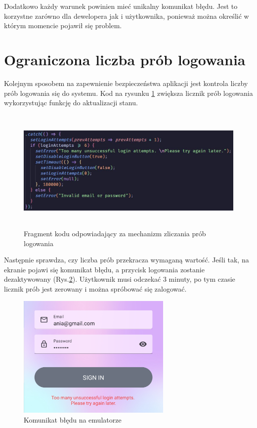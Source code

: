 Dodatkowo każdy warunek powinien mieć unikalny komunikat błędu. Jest to korzystne zarówno dla dewelopera jak i użytkownika, ponieważ można określić w którym momencie pojawił się problem.


\section*{Ograniczona liczba prób logowania}
Kolejnym sposobem na zapewnienie bezpieczeństwa aplikacji jest kontrola liczby prób logowania się do systemu. Kod na rysunku \ref{fig:LiczbaProb} zwiększa licznik prób logowania wykorzystując funkcję do aktualizacji stanu.

\begin{figure}[ht]
	\centering
	\includegraphics[height=6cm]{images/bezpieczenstwo/liczba_prob_kod}
	\caption{Fragment kodu odpowiadający za mechanizm zliczania prób logowania}
	\label{fig:LiczbaProb}
\end{figure}

 Następnie sprawdza, czy liczba prób przekracza wymaganą wartość. Jeśli tak, na ekranie pojawi się komunikat błędu, a przycisk logowania zostanie dezaktywowany (Rys.\ref{fig:Blad}). Użytkownik musi odczekać 3 minuty, po tym czasie licznik prób jest zerowany i można spróbować się zalogować.

\begin{figure}[ht]
	\centering
	\vspace{0.25cm}
	\includegraphics[height=6cm]{images/bezpieczenstwo/blad}
	\caption{Komunikat błędu na emulatorze}
	\label{fig:Blad}
\end{figure}

